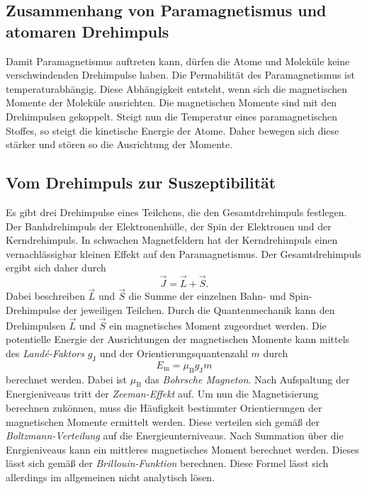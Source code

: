 \subsection{Zusammenhang von Paramagnetismus und atomaren Drehimpuls}
\label{subsec:drehimpuls}
Damit Paramagnetismus auftreten kann, dürfen die Atome und Moleküle keine verschwindenden Drehimpulse haben. Die Permabilität des 
Paramagnetismus ist temperaturabhängig. Diese Abhängigkeit entsteht, wenn sich die magnetischen Momente der Moleküle ausrichten. Die magnetischen Momente sind mit den Drehimpulsen 
gekoppelt. Steigt nun die Temperatur eines paramagnetischen Stoffes, so steigt die kinetische Energie der Atome. Daher bewegen sich diese stärker und stören so die Ausrichtung
der Momente. 

\subsection{Vom Drehimpuls zur Suszeptibilität}
\label{subsec:drehsus}
Es gibt drei Drehimpulse eines Teilchens, die den Gesamtdrehimpuls festlegen. Der Banhdrehimpuls der Elektronenhülle, der Spin der Elektronen und der Kerndrehimpuls. In schwachen 
Magnetfeldern hat der Kerndrehimpuls einen vernachlässigbar kleinen Effekt auf den Paramagnetismus. Der Gesamtdrehimpuls ergibt sich daher durch 
\begin{equation*}
    \vec{J} = \vec{L} + \vec{S}.
\end{equation*}
Dabei beschreiben $\vec{L}$ und $\vec{S}$ die Summe der einzelnen Bahn- und Spin- Drehimpulse der jeweiligen Teilchen. Durch die Quantenmechanik kann den Drehimpulsen 
$\vec{L}$ und $\vec{S}$
ein magnetisches Moment zugeordnet werden. 
Die potentielle Energie der Ausrichtungen der magnetischen Momente kann mittels des \textit{Landé-Faktors} $g_{\text{J}}$ und der Orientierungsquantenzahl $m$ durch 
\begin{equation}
    E_{\text{m}} = \mu_{\text{B}} g_{\text{J}} m
\end{equation} 
berechnet werden. Dabei ist $\mu_{\text{B}}$ das \textit{Bohrsche Magneton}. Nach Aufspaltung der Energieniveaus tritt der \textit{Zeeman-Effekt} auf. Um nun die Magnetisierung
berechnen zukönnen, muss die Häufigkeit bestimmter Orientierungen der magnetischen Momente ermittelt werden. Diese verteilen sich gemäß der \textit{Boltzmann-Verteilung}
auf die  Energieunterniveaus. Nach Summation über die Enrgieniveaus kann ein mittleres magnetisches Moment berechnet werden. Dieses lässt sich gemäß der \textit{Brillouin-Funktion}
berechnen. Diese Formel lässt sich allerdings im allgemeinen nicht analytisch lösen. 
